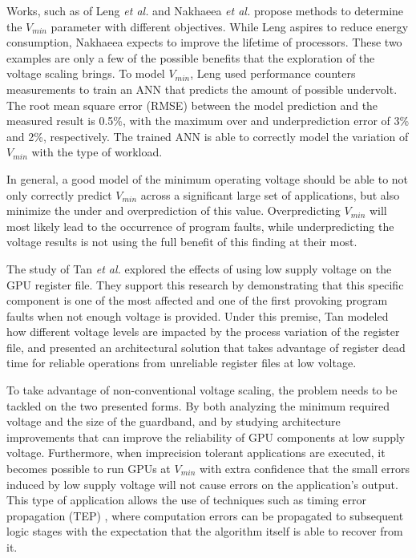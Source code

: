 Works, such as of Leng \textit{et al.} \cite{leng_safe_2015} and Nakhaeea  \textit{et al.} \cite{nakhaee_lifetime_2018} propose methods to determine the $V_{min}$ parameter with different objectives. While Leng aspires to reduce energy consumption, Nakhaeea expects to improve the lifetime of processors. These two examples are only a few of the possible benefits that the exploration of the voltage scaling brings. To model $V_{min}$, Leng used performance counters measurements to train an ANN that predicts the amount of possible undervolt. The root mean square error (RMSE) between the model prediction and the measured result is 0.5\%, with the maximum over and underprediction error of 3\% and 2\%, respectively. The trained ANN is able to correctly model the variation of $V_{min}$ with the type of workload.

In general, a good model of the minimum operating voltage should be able to not only correctly predict  $V_{min}$ across a significant large set of applications, but also minimize the under and overprediction of this value. Overpredicting $V_{min}$ will most likely lead to the occurrence of program faults, while underpredicting the voltage results is not using the full benefit of this finding at their most.

The study of Tan \textit{et al.} \cite{tan_combating_2016} explored the effects of using low supply voltage on the GPU register file. They support this research by demonstrating that this specific component is one of the most affected and one of the first provoking program faults when not enough voltage is provided. Under this premise, Tan modeled how different voltage levels are impacted by the process variation of the register file, and presented an architectural solution that takes advantage of register dead time for reliable operations from unreliable register files at low voltage. 

To take advantage of non-conventional voltage scaling, the problem needs to be tackled on the two presented forms. By both analyzing the minimum required voltage and the size of the guardband, and by studying architecture improvements that can improve the reliability of GPU components at low supply voltage. Furthermore, when imprecision tolerant applications are executed, it becomes possible to run GPUs at $V_{min}$ with extra confidence that the small errors induced by low supply voltage will not cause errors on the application's output. This type of application allows the use of techniques such as timing error propagation (TEP) \cite{nakhaee_lifetime_2018}, where computation errors can be propagated to subsequent logic stages with the expectation that the algorithm itself is able to recover from it.

